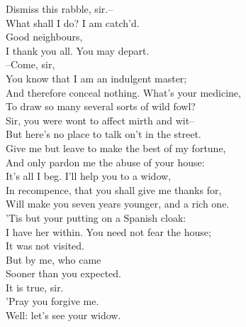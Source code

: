 \documentclass{memoir}
\begin{document}
\begin{drama*}
\facespeaks {} Dismiss this rabble, sir.--\\
 What shall I do? I am catch'd.\\
\lovewitspeaks {} Good neighbours,\\
 I thank you all. You may depart.\\
 --Come, sir,\\
 You know that I am an indulgent master;\\
 And therefore conceal nothing. What's your medicine,\\
 To draw so many several sorts of wild fowl?\\
\facespeaks  Sir, you were wont to affect mirth and wit--\\
 But here's no place to talk on't in the street.\\
 Give me but leave to make the best of my fortune,\\
 And only pardon me the abuse of your house:\\
 It's all I beg. I'll help you to a widow,\\
 In recompence, that you shall give me thanks for,\\
 Will make you seven years younger, and a rich one.\\
 'Tis but your putting on a Spanish cloak:\\
 I have her within. You need not fear the house;\\
 It was not visited.\\
\lovewitspeaks {} But by me, who came\\
 Sooner than you expected.\\
\facespeaks {} It is true, sir.\\
 'Pray you forgive me.\\
\lovewitspeaks {} Well: let's see your widow.\\
\scene


\end{drama*}
\end{document}
